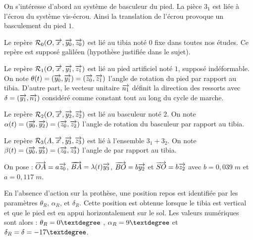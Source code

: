 \documentclass[10pt]{article}
\begin{document}
\begin{minipage}[c]{.54\linewidth}
On s'intéresse d'abord au système de basculeur du pied. La pièce $3_1$ est liée à l'écrou du système vis-écrou. Ainsi la translation de l'écrou provoque un basculement du pied $1$. 

Le repère $\mathcal{R}_{0} (O, \overrightarrow{x_{}},\overrightarrow{y_{0}} ,\overrightarrow{z_{0}})$ est lié au tibia noté $0$ fixe dans toutes nos études. Ce repère est supposé galiléen (hypothèse justifiée dans le sujet).

Le repère $\mathcal{R}_{1} (O, \overrightarrow{x_{}},\overrightarrow{y_{1}} ,\overrightarrow{z_{1}} )$ est lié au pied artificiel noté $1$, supposé indéformable. On note $\theta (t)=(\overrightarrow{y_{0}} ,\overrightarrow{y_{1}})=(\overrightarrow{z_{0}},\overrightarrow{z_{1}})$ l'angle de rotation du pied par rapport au tibia. D'autre part, le vecteur unitaire $\overrightarrow{n_1}$ définit la direction des ressorts avec $\delta=(\overrightarrow{y_{1}} ,\overrightarrow{n_1})$ considéré comme constant tout au long
du cycle de marche.

Le repère $\mathcal{R}_{2} (O, \overrightarrow{x_{}} ,\overrightarrow{y_{2}} ,\overrightarrow{z_{2}} )$ est lié au basculeur noté $2$. On note $\alpha(t) =(\overrightarrow{y_{0}} ,\overrightarrow{y_{2}})=(\overrightarrow{z_{0}} ,\overrightarrow{z_{2}})$ l'angle de rotation du basculeur par rapport au tibia.

Le repère $\mathcal{R}_{3} ( A, \overrightarrow{x_{}},\overrightarrow{y_{3}} ,\overrightarrow{z_{3}})$ est lié à l'ensemble $3_1+3_2$. On note $\beta(t )=(\overrightarrow{y_{0}} ,\overrightarrow{y_{3}})=(\overrightarrow{z_{0}} ,\overrightarrow{z_{3}})$ l'angle de par rapport au tibia.

On pose : $\overrightarrow{OA}=a\overrightarrow{z_0}$, $\overrightarrow{BA}=\lambda(t)\overrightarrow{y_{3}}$, $\overrightarrow{BO}=b\overrightarrow{y_{2}}$ et 
$\overrightarrow{SO}=b\overrightarrow{z_{2}}$ avec $b=0,039 \; m$ et $a=0,117\;m$.

En l'absence d'action sur la prothèse, une position repos est identifiée par les paramètres $\theta_R$, $\alpha_R$, et $\delta_R$. Cette position est obtenue lorsque le tibia est vertical et que le pied est en appui horizontalement
sur le sol. Les valeurs numériques sont alors : $\theta_R=0\textdegree$ , $\alpha_R=9\textdegree$ et $\delta_R=\delta=-17\textdegree$.
\end{minipage} \hfill
\end{document}
